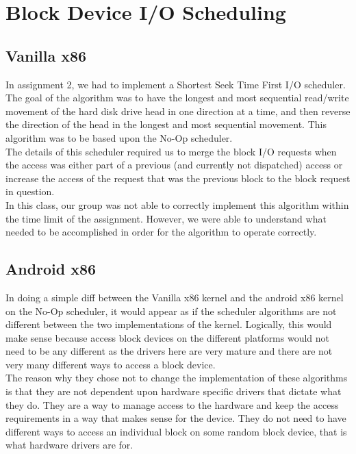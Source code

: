 \documentclass[letterpaper,10pt,titlepage]{article}
\begin{document}
\section{Block Device I/O Scheduling}
\subsection*{Vanilla x86}

In assignment 2, we had to implement a Shortest Seek Time First I/O scheduler. The goal of the algorithm was to have the longest and most sequential read/write movement of the hard disk drive head in one direction at a time, and then reverse the direction of the head in the longest and most sequential movement. This algorithm was to be based upon the No-Op scheduler.\\

The details of this scheduler required us to merge the block I/O requests when the access was either part of a previous (and currently not dispatched) access or increase the access of the request that was the previous block to the block request in question.\\

In this class, our group was not able to correctly implement this algorithm within the time limit of the assignment. However, we were able to understand what needed to be accomplished in order for the algorithm to operate correctly.\\

\subsection*{Android x86}

In doing a simple diff between the Vanilla x86 kernel and the android x86 kernel on the No-Op scheduler, it would appear as if the scheduler algorithms are not different between the two implementations of the kernel. Logically, this would make sense because access block devices on the different platforms would not need to be any different as the drivers here are very mature and there are not very many different ways to access a block device.\\

The reason why they chose not to change the implementation of these algorithms is that they are not dependent upon hardware specific drivers that dictate what they do. They are a way to manage access to the hardware and keep the access requirements in a way that makes sense for the device. They do not need to have different ways to access an individual block on some random block device, that is what hardware drivers are for.\\
\end{document}
